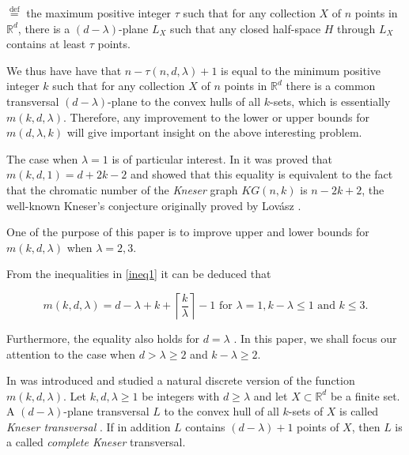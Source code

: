 \documentclass[11pt]{amsart}
\theoremstyle{plain}
\theoremstyle{definition}
\theoremstyle{remark}
\begin{document}
\smallskip
{}$\overset{\mathrm{def}}{=}$ the maximum positive integer $\tau$ such that for any collection $X$ of $n$ points in $\mathbb{R}^{d}$, there is a  $(d-\lambda )$-plane $L_X$ such that any closed half-space $H$ through $L_X$ contains at least $\tau$ points.
\smallskip

We thus have have that $n-\tau(n,d,\lambda)+1$ is equal to the minimum positive integer $k$ such that for any collection $X$ of $n$ points in $\mathbb{R}^{d}$  there is a common transversal $(d-\lambda )$-plane to the convex hulls of all $k$-sets, which is essentially $m(k,d,\lambda)$. Therefore, any improvement to the  lower or upper bounds for $m(d,\lambda, k)$ will give important insight on the above interesting problem.
\medskip

The case when $\lambda=1$ is of particular interest. In \cite{ABMR} it was proved that  $m(k,d,1)=d+2k-2$ and showed that this equality is equivalent to the fact that the chromatic number of the {\em Kneser} graph $KG(n,k)$ is $n-2k+2$, the well-known Kneser's conjecture originally proved by Lov\'asz \cite{L}.  
\medskip

One of the purpose of this paper is to improve upper and lower bounds for $m(k,d,\lambda)$ when $\lambda=2,3$.
\smallskip

From the inequalities in \eqref{ineq1} it can be deduced that

\begin{equation}\label{eq2}
m(k,d,\lambda ) = d-\lambda +k+\left\lceil \frac{k}{\lambda }\right\rceil -1 \text{ for } \lambda=1, k-\lambda{\leqslant} 1 \text{ and } k{\leqslant} 3.
\end{equation}

Furthermore, the equality also holds for $d=\lambda$ \cite[Theorem 6]{ABMR}. In this paper, we shall focus our attention to the case when $d >\lambda {\geqslant} 2$  and  $k-\lambda{\geqslant} 2$.  
\medskip

In \cite{CMMMR} was introduced and studied a natural discrete version of the function $m(k,d,\lambda)$. Let $k,d,\lambda {\geqslant} 1$ be integers with $d{\geqslant} \lambda $ and let $X\subset{\mathbb{R}}^{d}$ be a finite set. A $(d-\lambda)$-plane transversal $L$ to the convex hull of all $k$-sets of $X$ is called \emph{Kneser transversal} . If in addition $L$ contains $(d-\lambda)+1$ points of $X$, then $L$ is a called \emph{complete Kneser} transversal. 
\medskip
\end{document}
